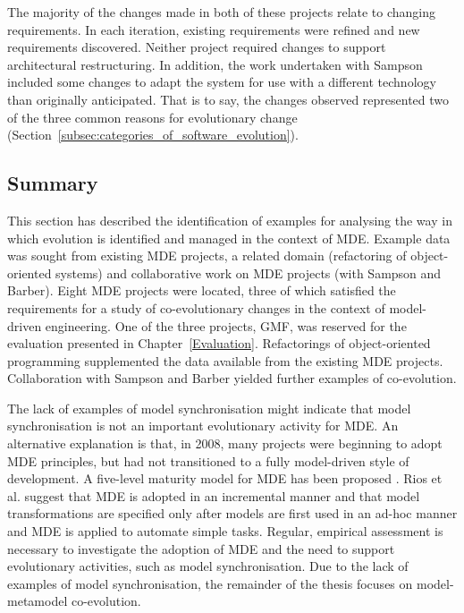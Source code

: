 The majority of the changes made in both of these projects relate to changing requirements. In each iteration, existing requirements were refined and new requirements discovered. Neither project required changes to support architectural restructuring. In addition, the work undertaken with Sampson included some changes to adapt the system for use with a different technology than originally anticipated. That is to say, the changes observed represented two of the three common reasons for evolutionary change (Section~\ref{subsec:categories_of_software_evolution}). 


\subsection{Summary}
This section has described the identification of examples for analysing the way in which evolution is identified and managed in the context of MDE. Example data was sought from existing MDE projects, a related domain (refactoring of object-oriented systems) and collaborative work on MDE projects (with Sampson and Barber). Eight MDE projects were located, three of which satisfied the requirements for a study of co-evolutionary changes in the context of model-driven engineering. One of the three projects, GMF, was reserved for the evaluation presented in Chapter~\ref{Evaluation}. Refactorings of object-oriented programming supplemented the data available from the existing MDE projects. Collaboration with Sampson and Barber yielded further examples of co-evolution.

The lack of examples of model synchronisation might indicate that model synchronisation is not an important evolutionary activity for MDE. An alternative explanation is that, in 2008, many projects were beginning to adopt MDE principles, but had not transitioned to a fully model-driven style of development. A \cc five-level maturity model for MDE has been proposed \cite{rios06mdd_maturity}. Rios et al. suggest that MDE is adopted in an incremental manner and that model transformations are specified only after models are first used in an ad-hoc manner and MDE is applied to automate simple tasks. Regular, empirical assessment is necessary to investigate the adoption of MDE and the need to support evolutionary activities, such as model synchronisation. Due to the lack of examples of model synchronisation, the remainder of the thesis focuses on model-metamodel co-evolution.

